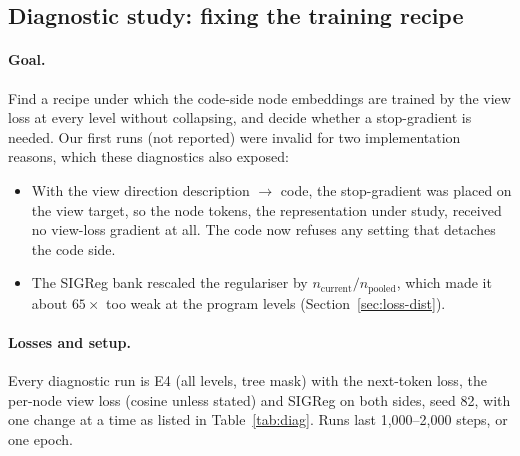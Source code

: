 \documentclass[11pt]{article}
\begin{document}
\subsection{Diagnostic study: fixing the training recipe}
\label{sec:exp-diag}

\paragraph{Goal.} Find a recipe under which the code-side node embeddings are trained by the view loss at every
level without collapsing, and decide whether a stop-gradient is needed. Our first runs (not reported) were invalid
for two implementation reasons, which these diagnostics also exposed:
\begin{itemize}
  \item With the view direction description $\to$ code, the stop-gradient was placed on the view target, so the
        node tokens, the representation under study, received no view-loss gradient at all. The code now refuses
        any setting that detaches the code side.
  \item The SIGReg bank rescaled the regulariser by $n_{\text{current}}/n_{\text{pooled}}$, which made it about
        $65\times$ too weak at the program levels (Section~\ref{sec:loss-dist}).
\end{itemize}

\paragraph{Losses and setup.} Every diagnostic run is E4 (all levels, tree mask) with the next-token loss, the
per-node view loss (cosine unless stated) and SIGReg on both sides, seed 82, with one change at a time as listed in
Table~\ref{tab:diag}. Runs last 1{,}000--2{,}000 steps, or one epoch.
\end{document}
